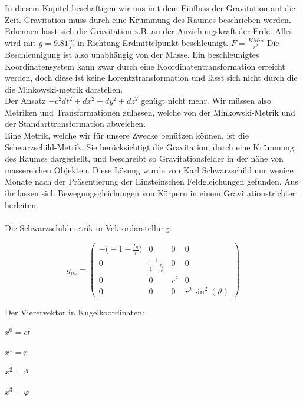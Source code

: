 \begin{refsection}
	In diesem Kapitel beschäftigen wir uns mit dem Einfluss der Gravitation auf die Zeit. Gravitation muss durch eine Krümmung des Raumes beschrieben werden. Erkennen lässt sich die Gravitation z.B. an der Anziehungskraft der Erde. Alles wird mit $g=9.81\frac{m}{s^2}$ in Richtung Erdmittelpunkt beschleunigt. $F=\frac{KMm}{r^2}$
	Die Beschleunigung ist also unabhängig von der Masse.
	Ein beschleunigtes Koordinatensystem kann zwar durch eine Koordinatentransformation erreicht werden, doch diese ist keine Lorentztransformation und lässt sich nicht durch die die Minkowski-metrik darstellen.\\ Der Ansatz $ -c^2dt^2 + dx^2 + dy^2 + dz^2$ genügt nicht mehr. Wir müssen also Metriken und Transformationen zulassen, welche von der Minkowski-Metrik und der Standarttransformation abweichen.\\
	Eine Metrik, welche wir für unsere Zwecke benützen können, ist die Schwarzschild-Metrik. Sie berücksichtigt die Gravitation, durch eine Krümmung des Raumes dargestellt, und beschreibt so Gravitationsfelder in der nähe von massereichen Objekten. Diese Lösung wurde von Karl Schwarzschild nur wenige Monate nach der Präsentierung der Einsteinschen Feldgleichungen gefunden. Aus ihr lassen sich Bewegungsgleichungen von Körpern in einem Gravitationstrichter herleiten.\\\\
	Die Schwarzschildmetrik in Vektordarstellung:



	\begin{equation}
		g_{\mu\nu}=
		\begin{pmatrix}
		-\biggl(-1-\frac{r_{g}}{r}\biggr) & 0 & 0 & 0 \\
		0 & \frac{1}{\displaystyle1-\frac{r_{g}}{r}} & 0 & 0 \\
		0 & 0 & r^{2} & 0 \\
		0 & 0 & 0 & r^{2}\sin^{2}(\vartheta)
		\end{pmatrix}
	\end{equation}

	Der Vierervektor in Kugelkoordinaten:

	\begin{list}{}{}
		\item \(x^{0}=ct\)
		\item \(x^{1}=r\)
		\item \(x^{2}=\vartheta\)
		\item \(x^{3}=\varphi\)
	\end{list}


\end{refsection}
